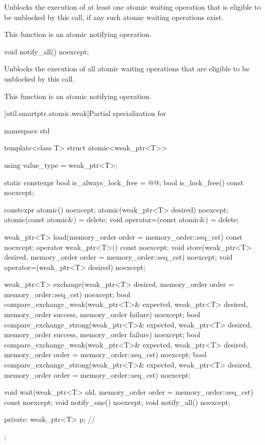 \begin{itemdescr}
\pnum
\effects
Unblocks the execution of at least one atomic waiting operation
that is eligible to be unblocked by this call,
if any such atomic waiting operations exist.

\pnum
\remarks
This function is an atomic notifying operation.
\end{itemdescr}

%
\begin{itemdecl}
void notify_all() noexcept;
\end{itemdecl}

\begin{itemdescr}
\pnum
\effects
Unblocks the execution of all atomic waiting operations
that are eligible to be unblocked by this call.

\pnum
\remarks
This function is an atomic notifying operation.
\end{itemdescr}

[util.smartptr.atomic.weak]{Partial specialization for }

%
\begin{codeblock}
namespace std {
  template<class T> struct atomic<weak_ptr<T>> {
    using value_type = weak_ptr<T>;

    static constexpr bool is_always_lock_free = @@;
    bool is_lock_free() const noexcept;

    constexpr atomic() noexcept;
    atomic(weak_ptr<T> desired) noexcept;
    atomic(const atomic&) = delete;
    void operator=(const atomic&) = delete;

    weak_ptr<T> load(memory_order order = memory_order::seq_cst) const noexcept;
    operator weak_ptr<T>() const noexcept;
    void store(weak_ptr<T> desired, memory_order order = memory_order::seq_cst) noexcept;
    void operator=(weak_ptr<T> desired) noexcept;

    weak_ptr<T> exchange(weak_ptr<T> desired,
                         memory_order order = memory_order::seq_cst) noexcept;
    bool compare_exchange_weak(weak_ptr<T>& expected, weak_ptr<T> desired,
                               memory_order success, memory_order failure) noexcept;
    bool compare_exchange_strong(weak_ptr<T>& expected, weak_ptr<T> desired,
                                 memory_order success, memory_order failure) noexcept;
    bool compare_exchange_weak(weak_ptr<T>& expected, weak_ptr<T> desired,
                               memory_order order = memory_order::seq_cst) noexcept;
    bool compare_exchange_strong(weak_ptr<T>& expected, weak_ptr<T> desired,
                                 memory_order order = memory_order::seq_cst) noexcept;

    void wait(weak_ptr<T> old, memory_order order = memory_order::seq_cst) const noexcept;
    void notify_one() noexcept;
    void notify_all() noexcept;

  private:
    weak_ptr<T> p;              // \expos
  };
}
\end{codeblock}

